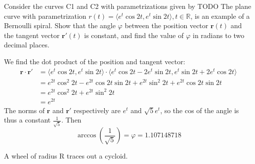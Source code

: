 \documentclass[12pt]{exam}
\begin{document}
\begin{questions}
\clearpage
\question Consider the curves C1 and C2 with parametrizations given by TODO
\clearpage
\question The plane curve with parametrization $r(t) = \langle e^t \cos 2t, e^t \sin 2t\rangle, t \in \mathbb{R}$, is an example of a Bernoulli
spiral. Show that the angle $\varphi$ between the position vector $\mathbf{r}(t)$ and the tangent vector $\mathbf{r}'(t)$ is constant, and find the value of $\varphi$ in radians to two decimal places.
	\begin{solution}
		We find the dot product of the position and tangent vector:
		\begin{align*}
			\mathbf{r} \cdot \mathbf{r'} &= \langle e^t \cos 2t, e^t \sin 2t \rangle \cdot \langle e^t \cos 2t - 2e^t \sin 2t, e^t \sin 2t + 2e^t \cos 2t \rangle \\
			&= e^{2t} \cos^2 2t - e^{2t} \cos 2t \sin 2t + e^{2t} \sin^2 2t + e^{2t} \cos 2t \sin 2t \\
			& = e^{2t} \cos^2 2t + e^{2t} \sin^2 2t \\
			&= e^{2t}
		\end{align*}
		The norms of $\mathbf{r}$ and $\mathbf{r'}$ respectively are $e^t$ and $\sqrt{5}e^t$, so the cos of the angle is thus a constant $\frac{1}{\sqrt{5}}$. Then 
		\[ \arccos (\frac{1}{\sqrt{5}}) = \boxed{\varphi = 1.107148718} \tag*{\qed} \]
	\end{solution}
\question A wheel of radius R traces out a cycloid.
	\begin{parts}

\end{parts}
\end{questions}
\end{document}
